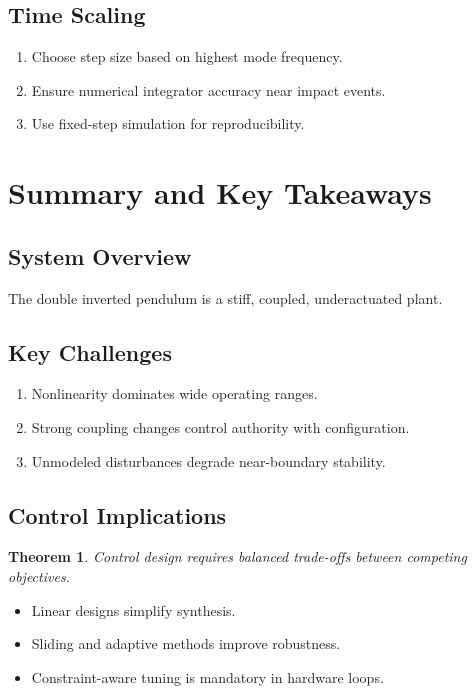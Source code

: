 \documentclass[11pt,a4paper]{article}
\newtheorem{theorem}{Theorem}[section]
\begin{document}
\subsection{Time Scaling}
\begin{enumerate}
    
    \item Choose step size based on highest mode frequency.
    \item Ensure numerical integrator accuracy near impact events.
    \item Use fixed-step simulation for reproducibility.
\end{enumerate}

\section{Summary and Key Takeaways}

\subsection{System Overview}
The double inverted pendulum is a stiff, coupled, underactuated plant.

\subsection{Key Challenges}
\begin{enumerate}
    \item Nonlinearity dominates wide operating ranges.
    \item Strong coupling changes control authority with configuration.
    \item Unmodeled disturbances degrade near-boundary stability.
\end{enumerate}

\subsection{Control Implications}
\begin{theorem}
Control design requires balanced trade-offs between competing objectives.
\end{theorem}
\begin{itemize}
    \item Linear designs simplify synthesis.
    \item Sliding and adaptive methods improve robustness.
    \item Constraint-aware tuning is mandatory in hardware loops.
\end{itemize}
\end{document}
